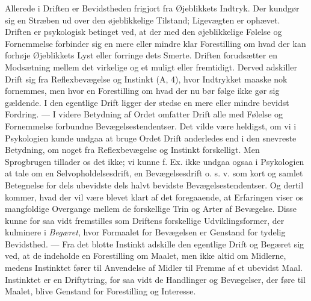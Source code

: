\documentclass[12pt,a4paper,openany]{book}
\begin{document}
Allerede i Driften er Bevidstheden frigjort fra Øjeblikkets Indtryk. Der
kundgør sig en Stræben ud over den øjeblikkelige Tilstand; Ligevægten er
ophævet. Driften er psykologisk betinget ved, at der med den
øjeblikkelige Følelse og Fornemmelse forbinder sig en mere eller mindre
klar Forestilling om hvad der kan forhøje Øjeblikkets Lyst eller
forringe dets Smerte. Driften forudsætter en Modsætning mellem det
virkelige og et muligt eller fremtidigt. Derved adskiller Drift sig fra
Reflexbevægelse og Instinkt (A, 4), hvor Indtrykket maaske nok
fornemmes, men hvor en Forestilling om hvad der nu bør følge ikke gør
sig gældende. I den egentlige Drift ligger der stedse en mere eller
mindre bevidst Fordring. --- I videre Betydning af Ordet omfatter Drift
alle med Følelse og Fornemmelse forbundne Bevægelsestendentser. Det
vilde være heldigst, om vi i Psykologien kunde undgaa at bruge Ordet
Drift anderledes end i den snevreste Betydning, om noget fra
Reflexbevægelse og Instinkt forskelligt. Men Sprogbrugen tillader os det
ikke; vi kunne f. Ex. ikke undgaa ogsaa i Psykologien at tale om en
Selvopholdelsesdrift, en Bevægelsesdrift o. s. v. som kort og samlet
Betegnelse for dels ubevidste dels halvt bevidste Bevægelsestendentser.
Og dertil kommer, hvad der vil være blevet klart af det foregaaende, at
Erfaringen viser os mangfoldige Overgange mellem de forskellige Trin og
Arter af Bevægelse. Disse kunne for saa vidt fremstilles som Driftens
forskellige Udviklingsformer, der kulminere i \emph{Begæret}, hvor
Formaalet for Bevægelsen er Genstand for tydelig Bevidsthed. --- Fra det
blotte Instinkt adskille den egentlige Drift og Begæret sig ved, at de
indeholde en Forestilling om Maalet, men ikke altid om Midlerne, medens
Instinktet fører til Anvendelse af Midler til Fremme af et ubevidst
Maal. Instinktet er en Driftytring, for saa vidt de Handlinger og
Bevægelser, der føre til Maalet, blive Genstand for Forestilling og
Interesse.
\end{document}
